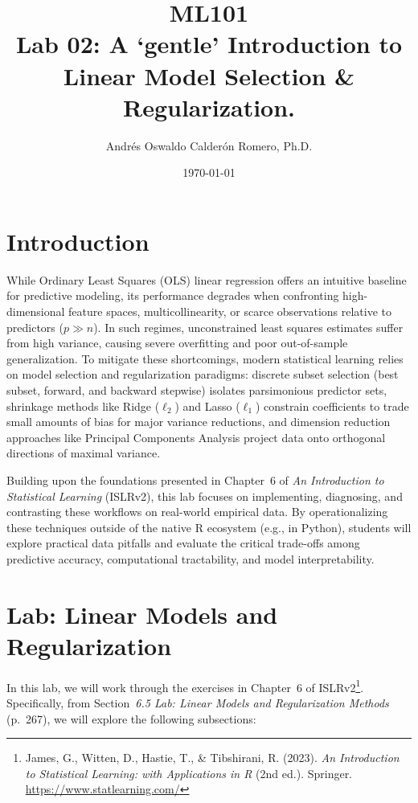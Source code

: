 \documentclass{article}
\title{ML101 \\ Lab 02: A `gentle' Introduction to Linear Model Selection \& Regularization.}
\author{Andrés Oswaldo Calderón Romero, Ph.D.}
\date{\today}
\begin{document}
\maketitle

\section{Introduction}
\label{sec:intro}

While Ordinary Least Squares (OLS) linear regression offers an intuitive baseline for predictive modeling, its performance degrades when confronting high-dimensional feature spaces, multicollinearity, or scarce observations relative to predictors ($p \gg n$). In such regimes, unconstrained least squares estimates suffer from high variance, causing severe overfitting and poor out-of-sample generalization. To mitigate these shortcomings, modern statistical learning relies on model selection and regularization paradigms: discrete subset selection (best subset, forward, and backward stepwise) isolates parsimonious predictor sets, shrinkage methods like Ridge ($\ell_2$) and Lasso ($\ell_1$) constrain coefficients to trade small amounts of bias for major variance reductions, and dimension reduction approaches like Principal Components Analysis project data onto orthogonal directions of maximal variance.

Building upon the foundations presented in Chapter~6 of \textit{An Introduction to Statistical Learning} (ISLRv2), this lab focuses on implementing, diagnosing, and contrasting these workflows on real-world empirical data. By operationalizing these techniques outside of the native R ecosystem (e.g., in Python), students will explore practical data pitfalls and evaluate the critical trade-offs among predictive accuracy, computational tractability, and model interpretability.


\section{Lab: Linear Models and Regularization}
\label{sec:lab}

In this lab, we will work through the exercises in Chapter~6 of ISLRv2\footnote{James, G., Witten, D., Hastie, T., \& Tibshirani, R. (2023). \textit{An Introduction to Statistical Learning: with Applications in R} (2nd ed.). Springer. \url{https://www.statlearning.com/}}. Specifically, from Section~\textit{6.5 Lab: Linear Models and Regularization Methods} (p.~267), we will explore the following subsections:
\end{document}
